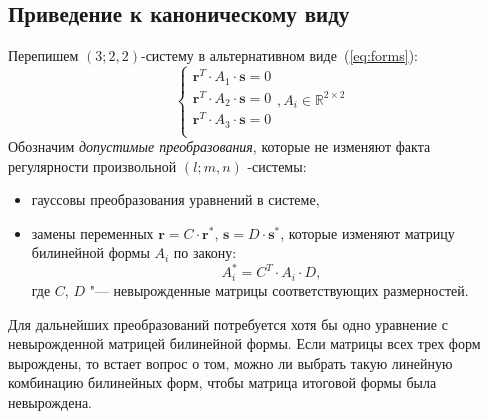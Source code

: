 \subsection{Приведение к каноническому виду}
Перепишем $(3; 2, 2)$-систему в альтернативном виде~(\ref{eq:forms}): 
\begin{equation}\label{eq:simple_forms}
	\begin{cases}
		\mathbf{r}^T \cdot A_1 \cdot \mathbf{s} = 0 \\ 
		\mathbf{r}^T \cdot A_2 \cdot \mathbf{s} = 0 \\ 
		\mathbf{r}^T \cdot A_3 \cdot \mathbf{s} = 0 \\ 
	\end{cases}, A_i \in \mathbb{R}^{2 \times 2}
\end{equation}
Обозначим \textit{допустимые преобразования}, которые не изменяют факта регулярности
произвольной $(l; m, n)$ -системы: 
\begin{itemize}
 	\item гауссовы преобразования уравнений в системе, 
	
	\item замены переменных $\mathbf{r} = C \cdot \mathbf{r}^*$, $\mathbf{s} = D \cdot 
	\mathbf{s}^*$, которые изменяют матрицу билинейной формы $A_i$ по закону:
	$$
		A^{*}_{i} = C^T \cdot A_i \cdot D,
	$$ где $C$, $D$ "--- невырожденные матрицы соответствующих размерностей.
\end{itemize}

Для дальнейших преобразований потребуется хотя бы одно уравнение с невырожденной матрицей 
билинейной формы. Если матрицы всех трех форм вырождены, то встает вопрос о том, можно ли 
выбрать такую линейную комбинацию билинейных форм, чтобы матрица итоговой формы была 
невырождена. 

